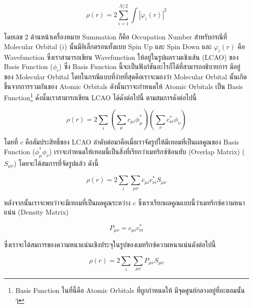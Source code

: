 \begin{equation}\label{eq:charge_density}
    \rho (r) = 2 \sum^{N/2}_{i=1} \int |\varphi_{i}(r)|^{2}
\end{equation}

\noindent โดยเลข 2 ด้านหน้าเครื่องหมาย Summation ก็คือ Occupation Number สำหรับกรณีที่ Molecular Orbital ($i$) 
นั้นมีอิเล็กตรอนทั้งแบบ Spin Up และ Spin Down และ $\varphi_{i}(r)$ คือ Wavefunction ซึ่งเราสามารถเขียน Wavefunction 
ให้อยู่ในรูปผลรวมเชิงเส้น (LCAO) ของ Basis Function ($\phi_{i}$) ซึ่ง Basis Function นี้จะเป็นฟังก์ชันอะไรก็ได้ที่สามารถอธิบายการ%
มีอยู่ของ Molecular Orbital โดยในกรณีแบบที่ง่ายที่สุดคือเราจะมองว่า Molecular Orbital นั้นเกิดขึ้นจากการรวมกันของ Atomic Orbitals 
ดังนั้นเราจะกำหนดให้ Atomic Orbitals เป็น Basis Function\footnote{Basis Function ในที่นี้คือ Atomic Orbitals ที่ถูกกำหนดให้%
มีจุดศูนย์กลางอยู่ที่อะตอมนั้น ๆ} ดังนั้นเราสามารถเขียน LCAO ได้ดังต่อไปนี้ 
ตามสมการดังต่อไปนี้

\begin{equation}
    \rho (r) = 2 \sum_{i} \left ( \sum_{\mu} c_{\mu i} \phi_{\mu}^{*} \right ) 
    \left ( \sum_{\nu} c^{*}_{\nu i}  \phi_{\nu} \right )
\end{equation}

\noindent โดยที่ $c$ คือสัมประสิทธิ์ของ LCAO ลำดับต่อมาคือเมื่อเราจัดรูปให้มีเทอมที่เป็นผลคูณของ Basis Function ($\phi_{\mu}^{*} 
\phi_{\nu}$) เราจะกำหนดให้เทอมนี้เป็นสิ่งที่เรียกว่าเมทริกซ์ซ้อนทับ (Overlap Matrix) ($S_{\mu\nu}$) โดยจะได้สมการที่จัดรูปแล้ว ดังนี้

\begin{equation}
    \rho (r) = 2 \sum_{i}\sum_{\mu\nu} c_{\mu i} c^{*}_{\nu i} S_{\mu\nu}
\end{equation}

หลังจากนั้นเราจะพบว่าจะมีเทอมที่เป็นผลคูณระหว่าง $c$ ซึ่งเราเรียกผลคูณแบบนี้ว่าเมทริกซ์ความหนาแน่น (Density Matrix) 

\begin{equation}\label{eq:density_matrix}
    P_{\mu\nu} = c_{\mu i} c^{*}_{\nu i}
\end{equation}

\noindent ซึ่งเราจะได้สมการของความหนาแน่นเชิงประจุในรูปของเมทริกซ์ความหนาแน่นดังต่อไปนี้

\begin{equation}\label{eq:charge_density_matrix}
    \rho (r) = 2 \sum_{i} \sum_{\mu\nu} P_{\mu\nu}S_{\mu\nu}
\end{equation}

